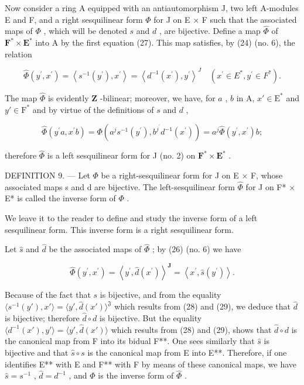 Now consider a ring A equipped with an antiautomorphism J, two left A-modules E and F, and a right sesquilinear form \(\Phi\) for J on E \(\times\) F such that the associated maps of \(\Phi\) , which will be denoted \(s\) and \(d\) , are bijective. Define a map \(\hat{\Phi}\) of \(\mathbf{F}^{*} \times \mathbf{E}^{*}\) into A by the first equation (27). This map satisfies, by (24) (no. 6), the relation

\[
\hat {\Phi} (y ^ {\prime}, x ^ {\prime}) = \left\langle s ^ {- 1} (y ^ {\prime}), x ^ {\prime} \right\rangle = \left\langle d ^ {- 1} (x ^ {\prime}), y ^ {\prime} \right\rangle^ {J} \quad (x ^ {\prime} \in E ^ {*}, y ^ {\prime} \in F ^ {*}).\tag{28}
\]

The map \(\hat{\Phi}\) is evidently \(\mathbf{Z}\) -bilinear; moreover, we have, for \(a\) , \(b\) in A, \(x' \in \mathrm{E}^*\) and \(y' \in \mathrm{F}^*\) and by virtue of the definitions of \(s\) and \(d\) ,

\[
\widehat {\Phi} (y ^ {\prime} a, x ^ {\prime} b) = \Phi (a ^ {j} s ^ {- 1} (y ^ {\prime}), b ^ {j ^ {\prime}} d ^ {- 1} (x ^ {\prime})) = a ^ {j} \widehat {\Phi} (y ^ {\prime}, x ^ {\prime}) b;
\]

therefore \(\hat{\Phi}\) is a left sesquilinear form for J (no. 2) on \(\mathbf{F}^{*} \times \mathbf{E}^{*}\) .

DEFINITION 9. --- Let \(\Phi\) be a right-sesquilinear form for J on E × F, whose associated maps s and d are bijective. The left-sesquilinear form \(\hat{\Phi}\) for J on F* × E* is called the inverse form of \(\Phi\) .

We leave it to the reader to define and study the inverse form of a left sesquilinear form. This inverse form is a right sesquilinear form.

Let \(\hat{s}\) and \(\hat{d}\) be the associated maps of \(\hat{\Phi}\) ; by (26) (no. 6) we have

\[
\hat {\Phi} (y ^ {\prime}, x ^ {\prime}) = \left\langle y ^ {\prime}, \hat {d} (x ^ {\prime}) \right\rangle^ {\mathbf {J}} = \left\langle x ^ {\prime}, \hat {s} (y ^ {\prime}) \right\rangle .\tag{29}
\]

Because of the fact that \(s\) is bijective, and from the equality \(\langle s^{-1}(y'), x'\rangle = \langle y', \hat{d}(x') \rangle^{\mathfrak{J}}\) which results from (28) and (29), we deduce that \(\hat{d}\) is bijective; therefore \(\hat{d} \circ d\) is bijective. But the equality \(\langle d^{-1}(x'), y' \rangle = \langle y', \hat{d}(x') \rangle\) which results from (28) and (29), shows that \(\hat{d} \circ d\) is the canonical map from F into its bidual F**. One sees similarly that \(\hat{s}\) is bijective and that \(\hat{s} \circ s\) is the canonical map from E into E**. Therefore, if one identifies E** with E and F** with F by means of these canonical maps, we have \(\hat{s} = s^{-1}\) , \(\hat{d} = d^{-1}\) , and \(\Phi\) is the inverse form of \(\hat{\Phi}\) .

